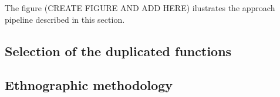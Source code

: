The figure (CREATE FIGURE AND ADD HERE) ilustrates the approach pipeline described in this section.





\subsection{Selection of the duplicated functions}

\subsection{Ethnographic methodology}





